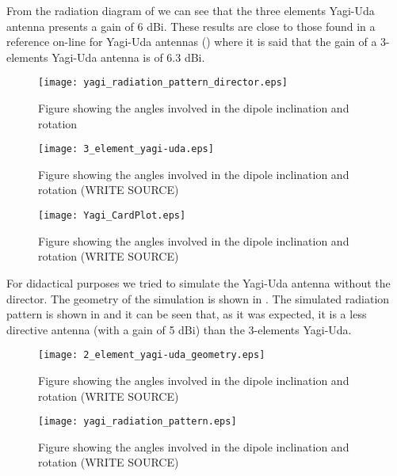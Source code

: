 From the radiation diagram of  we can see that the three elements Yagi-Uda antenna presents a gain of 6 dBi. These results are close to those found in a reference on-line for Yagi-Uda antennas () where it is said that the gain of a 3-elements Yagi-Uda antenna is of 6.3 dBi.

\begin{figure}[!h]
  \centering
  \texttt{[image: yagi\_radiation\_pattern\_director.eps]}
  \caption{Figure showing the angles involved in the dipole inclination and rotation}
  \label{fig:yagi_radiation_pattern_director}
\end{figure}

\begin{figure}[!h]
  \centering
  \texttt{[image: 3\_element\_yagi-uda.eps]}
  \caption{Figure showing the angles involved in the dipole inclination and rotation (WRITE SOURCE)}
  \label{fig:3_element_yagi-uda}
\end{figure}


\begin{figure}[!h]
  \centering
  \texttt{[image: Yagi\_CardPlot.eps]}
  \caption{Figure showing the angles involved in the dipole inclination and rotation (WRITE SOURCE)}
  \label{fig:Yagi_CardPlot}
\end{figure}


For didactical purposes we tried to simulate the Yagi-Uda antenna without the director. The geometry of the simulation is shown in . The simulated radiation pattern is shown in  and it can be seen that, as it was expected, it is a less directive antenna (with a gain of 5 dBi) than the 3-elements Yagi-Uda.

\begin{figure}[!h]
  \centering
  \texttt{[image: 2\_element\_yagi-uda\_geometry.eps]}
  \caption{Figure showing the angles involved in the dipole inclination and rotation (WRITE SOURCE)}
  \label{fig:2_element_yagi-uda_geometry}
\end{figure}

\begin{figure}[!h]
  \centering
  \texttt{[image: yagi\_radiation\_pattern.eps]}
  \caption{Figure showing the angles involved in the dipole inclination and rotation (WRITE SOURCE)}
  \label{fig:yagi_radiation_pattern}
\end{figure}
